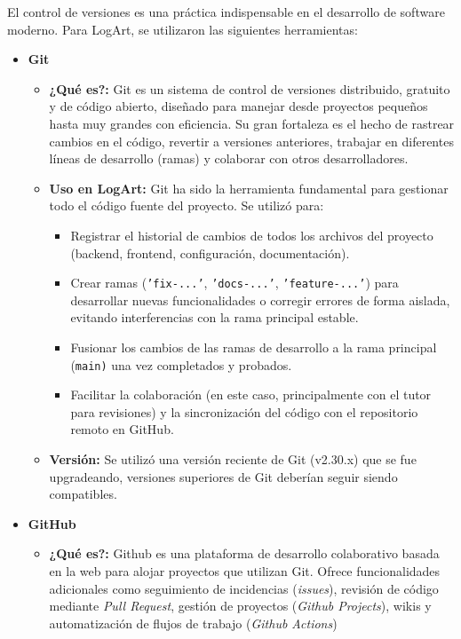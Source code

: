 El control de versiones es una práctica indispensable en el desarrollo de software moderno. Para LogArt, se utilizaron las siguientes herramientas:
    \begin{itemize}
        \item \textbf{Git}
            \begin{itemize}
                \item \textbf{¿Qué es?:} Git es un sistema de control de versiones distribuido, gratuito y de código abierto, diseñado para manejar desde proyectos pequeños hasta muy grandes con eficiencia. Su gran fortaleza es el hecho de rastrear cambios en el código, revertir a versiones anteriores, trabajar en diferentes líneas de desarrollo (ramas) y colaborar con otros desarrolladores. \cite{gitlabDVCSBenefits}
                \item \textbf{Uso en LogArt:} Git ha sido la herramienta fundamental para gestionar todo el código fuente del proyecto. Se utilizó para:
                    \begin{itemize}
                        \item Registrar el historial de cambios de todos los archivos del proyecto (backend, frontend, configuración, documentación).
                        \item Crear ramas (\texttt{'fix-...'}, \texttt{'docs-...'}, \texttt{'feature-...'}) para desarrollar nuevas funcionalidades o corregir errores de forma aislada, evitando interferencias con la rama principal estable.
                        \item Fusionar los cambios de las ramas de desarrollo a la rama principal (\texttt{main)} una vez completados y probados.
                        \item Facilitar la colaboración (en este caso, principalmente con el tutor para revisiones) y la sincronización del código con el repositorio remoto en GitHub.
                    \end{itemize}
                \item \textbf{Versión:} Se utilizó una versión reciente de Git (v2.30.x) que se fue upgradeando, versiones superiores de Git deberían seguir siendo compatibles.
            \end{itemize}
        \vspace{0.3cm}
        \item \textbf{GitHub}
            \begin{itemize}
                \item \textbf{¿Qué es?:} Github es una plataforma de desarrollo colaborativo basada en la web para alojar proyectos que utilizan Git. Ofrece funcionalidades adicionales como seguimiento de incidencias (\textit{issues}), revisión de código mediante \textit{Pull Request}, gestión de proyectos (\textit{Github Projects}), wikis y automatización de flujos de trabajo (\textit{Github Actions})

\end{itemize}
\end{itemize}
